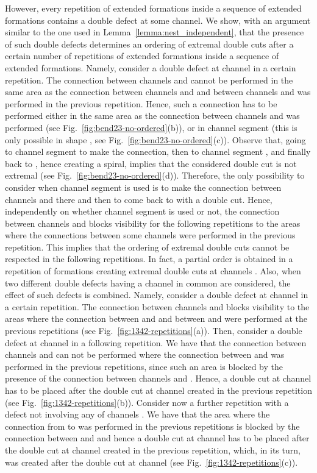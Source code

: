 \documentclass[a4paper,10pt]{llncs}
\renewenvironment{proof}
{{\bf Proof:}}{\hspace*{\fill}\par\vspace{2mm}}
\begin{document}
\begin{proof}
However, every repetition of extended formations inside a sequence of extended formations contains a double defect at some channel. We show, with an argument similar to the one used in Lemma~\ref{lemma:nest_independent}, that the presence of such double defects determines an ordering  of extremal double cuts after a certain number of repetitions of extended formations inside a sequence of extended formations. Namely, consider a double defect at channel  in a certain repetition. The connection between channels  and  cannot be performed in the same area as the connection between channels  and  and between channels  and  was performed in the previous repetition. Hence, such a connection has to be performed either in the same area as the connection between channels  and  was performed (see Fig.~\ref{fig:bend23-no-ordered}(b)), or in channel segment  (this is only possible in shape  , see Fig.~\ref{fig:bend23-no-ordered}(c)).
Observe that, going to channel segment  to make the connection, then to channel segment , and finally back to , hence creating a spiral, implies that the considered double cut is not extremal (see Fig.~\ref{fig:bend23-no-ordered}(d)). Therefore, the only possibility to consider when channel segment  is used is to make the connection between channels  and  there and then to come back to  with a double cut. Hence, independently on whether channel segment  is used or not, the connection between channels  and  blocks visibility for the following repetitions to the areas where the connections between some channels were performed in the previous repetition. This implies that the ordering  of extremal double cuts cannot be respected in the following repetitions. In fact, a partial order  is obtained in a repetition of formations creating extremal double cuts at channels . Also, when two different double defects having a channel in common are considered, the effect of such defects is combined. Namely, consider a double defect at channel  in a certain repetition. The connection between channels  and  blocks visibility to the areas where the connection between  and  and between  and  were performed at the previous repetitions (see Fig.~\ref{fig:1342-repetitions}(a)). Then, consider a double defect at channel  in a following repetition. We have that the connection between channels  and  can not be performed where the connection between  and  was performed in the previous repetitions, since such an area is blocked by the presence of the connection between channels  and . Hence, a double cut at channel  has to be placed after the double cut at channel  created in the previous repetition (see Fig.~\ref{fig:1342-repetitions}(b)). Consider now a further repetition with a defect not involving any of channels . We have that the area where the connection from  to  was performed in the previous repetitions is blocked by the connection between  and  and hence a double cut at channel  has to be placed after the double cut at channel  created in the previous repetition, which, in its turn, was created after the double cut at channel  (see Fig.~\ref{fig:1342-repetitions}(c)).


\end{proof}
\end{document}
